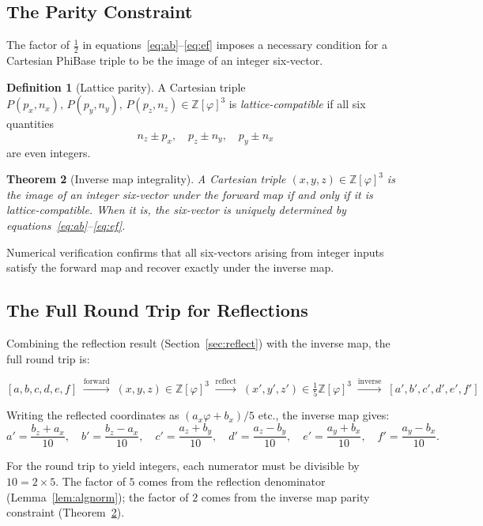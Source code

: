 \documentclass[12pt]{article}
\newtheorem{theorem}{Theorem}[section]
\theoremstyle{definition}
\newtheorem{definition}[theorem]{Definition}
\theoremstyle{remark}
\begin{document}
\subsection{The Parity Constraint}

The factor of $\tfrac{1}{2}$ in equations~\eqref{eq:ab}--\eqref{eq:ef}
imposes a necessary condition for a Cartesian PhiBase triple to be the
image of an integer six-vector.

\begin{definition}[Lattice parity]
A Cartesian triple $P(p_x,n_x),\,P(p_y,n_y),\,P(p_z,n_z) \in
\mathbb{Z}[\varphi]^3$ is \emph{lattice-compatible} if all six
quantities
\[
  n_z \pm p_x,\quad p_z \pm n_y,\quad p_y \pm n_x
\]
are even integers.
\end{definition}

\begin{theorem}[Inverse map integrality]
\label{thm:inverse}
A Cartesian triple $(x,y,z) \in \mathbb{Z}[\varphi]^3$ is the image
of an integer six-vector under the forward map if and only if it is
lattice-compatible.  When it is, the six-vector is uniquely determined
by equations~\eqref{eq:ab}--\eqref{eq:ef}.
\end{theorem}

Numerical verification confirms that all six-vectors arising from
integer inputs satisfy the forward map and recover exactly under the
inverse map.

\subsection{The Full Round Trip for Reflections}

Combining the reflection result (Section~\ref{sec:reflect}) with the
inverse map, the full round trip is:

\[
  [a,b,c,d,e,f]
  \;\xrightarrow{\text{forward}}\;
  (x,y,z) \in \mathbb{Z}[\varphi]^3
  \;\xrightarrow{\text{reflect}}\;
  (x',y',z') \in \tfrac{1}{5}\mathbb{Z}[\varphi]^3
  \;\xrightarrow{\text{inverse}}\;
  [a',b',c',d',e',f']
\]

Writing the reflected coordinates as $(a_x\varphi + b_x)/5$ etc., the
inverse map gives:
\[
  a' = \frac{b_z + a_x}{10}, \quad
  b' = \frac{b_z - a_x}{10}, \quad
  c' = \frac{a_z + b_y}{10}, \quad
  d' = \frac{a_z - b_y}{10}, \quad
  e' = \frac{a_y + b_x}{10}, \quad
  f' = \frac{a_y - b_x}{10}.
\]

For the round trip to yield integers, each numerator must be divisible
by $10 = 2 \times 5$.  The factor of $5$ comes from the reflection
denominator (Lemma~\ref{lem:algnorm}); the factor of $2$ comes from
the inverse map parity constraint (Theorem~\ref{thm:inverse}).
\end{document}
